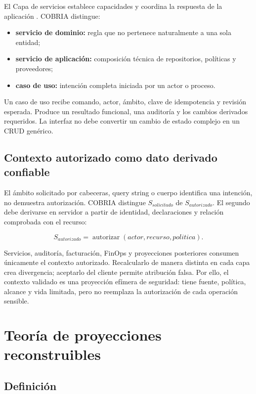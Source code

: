 El Capa de servicios establece capacidades y coordina la respuesta de la aplicación
\parencite{fowler2002poeaa}. COBRIA distingue:

\begin{itemize}[leftmargin=*]
  \item \textbf{servicio de dominio:} regla que no pertenece naturalmente a una sola
  entidad;
  \item \textbf{servicio de aplicación:} composición técnica de repositorios, políticas
  y proveedores;
  \item \textbf{caso de uso:} intención completa iniciada por un actor o proceso.
\end{itemize}

Un caso de uso recibe comando, actor, ámbito, clave de idempotencia y revisión esperada.
Produce un resultado funcional, una auditoría y los cambios derivados requeridos. La
interfaz no debe convertir un cambio de estado complejo en un CRUD genérico.

\section{Contexto autorizado como dato derivado confiable}

El ámbito solicitado por cabeceras, query string o cuerpo identifica una intención, no
demuestra autorización. COBRIA distingue \(S_{solicitado}\) de
\(S_{autorizado}\). El segundo debe derivarse en servidor a partir de identidad,
declaraciones y relación comprobada con el recurso:

\[
S_{autorizado}=\operatorname{autorizar}(actor,recurso,politica).
\]

Servicios, auditoría, facturación, FinOps y proyecciones posteriores consumen únicamente
el contexto autorizado. Recalcularlo de manera distinta en cada capa crea divergencia;
aceptarlo del cliente permite atribución falsa. Por ello, el contexto validado es una
proyección efímera de seguridad: tiene fuente, política, alcance y vida limitada, pero
no reemplaza la autorización de cada operación sensible.

\chapter{Teoría de proyecciones reconstruibles}
\label{ch:proyecciones}

\section{Definición}

